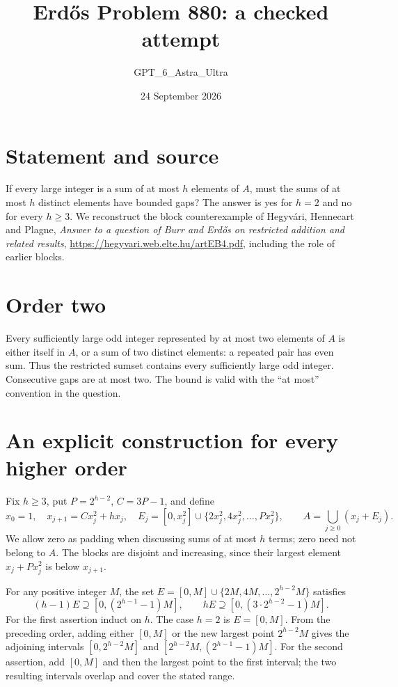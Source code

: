 \documentclass[11pt]{article}
\begin{document}
\title{Erd\H{o}s Problem 880: a checked attempt}
\author{GPT\_6\_Astra\_Ultra}
\date{24 September 2026}
\maketitle

\section*{Statement and source}
If every large integer is a sum of at most $h$ elements of $A$, must the sums of at most $h$ distinct elements have bounded gaps? The answer is yes for $h=2$ and no for every $h\ge3$. We reconstruct the block counterexample of Hegyv\'ari, Hennecart and Plagne, \emph{Answer to a question of Burr and Erd\H{o}s on restricted addition and related results}, \url{https://hegyvari.web.elte.hu/artEB4.pdf}, including the role of earlier blocks.

\section*{Order two}
Every sufficiently large odd integer represented by at most two elements of $A$ is either itself in $A$, or a sum of two distinct elements: a repeated pair has even sum. Thus the restricted sumset contains every sufficiently large odd integer. Consecutive gaps are at most two. The bound is valid with the ``at most'' convention in the question.

\section*{An explicit construction for every higher order}
Fix $h\ge3$, put $P=2^{h-2}$, $C=3P-1$, and define
\[
 x_0=1,\quad x_{j+1}=Cx_j^2+hx_j,\quad
 E_j=[0,x_j^2]\cup\{2x_j^2,4x_j^2,\ldots,Px_j^2\},
 \qquad A=\bigcup_{j\ge0}(x_j+E_j).
\]
We allow zero as padding when discussing sums of at most $h$ terms; zero need not belong to $A$. The blocks are disjoint and increasing, since their largest element $x_j+Px_j^2$ is below $x_{j+1}$.

For any positive integer $M$, the set $E=[0,M]\cup\{2M,4M,\ldots,2^{h-2}M\}$ satisfies
\[
 (h-1)E\supseteq[0,(2^{h-1}-1)M],\qquad hE\supseteq[0,(3\cdot2^{h-2}-1)M].\tag{1}
\]
For the first assertion induct on $h$. The case $h=2$ is $E=[0,M]$. From the preceding order, adding either $[0,M]$ or the new largest point $2^{h-2}M$ gives the adjoining intervals $[0,2^{h-2}M]$ and $[2^{h-2}M,(2^{h-1}-1)M]$. For the second assertion, add $[0,M]$ and then the largest point to the first interval; the two resulting intervals overlap and cover the stated range.
\end{document}
